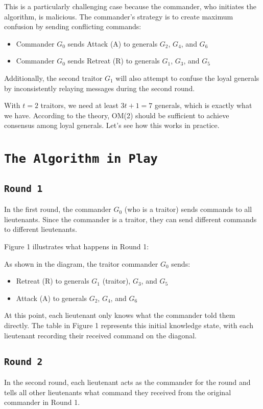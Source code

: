 \documentclass[11pt]{article}
\newcommand{\gen}[1]{\ensuremath{G_{#1}}}
\begin{document}
This is a particularly challenging case because the commander, who initiates the algorithm, is malicious. The commander's strategy is to create maximum confusion by sending conflicting commands:
\begin{itemize}
    \item Commander $G_0$ sends Attack (A) to generals $G_2$, $G_4$, and $G_6$
    \item Commander $G_0$ sends Retreat (R) to generals $G_1$, $G_3$, and $G_5$
\end{itemize}

Additionally, the second traitor $G_1$ will also attempt to confuse the loyal generals by inconsistently relaying messages during the second round.

With $t = 2$ traitors, we need at least $3t+1 = 7$ generals, which is exactly what we have. According to the theory, OM(2) should be sufficient to achieve consensus among loyal generals. Let's see how this works in practice.

\section*{\texttt{\Large The Algorithm in Play}}

\subsection*{\texttt{\large Round 1}}
In the first round, the commander $\gen{0}$ (who is a traitor) sends commands to all lieutenants. Since the commander is a traitor, they can send different commands to different lieutenants.

Figure 1 illustrates what happens in Round 1:



As shown in the diagram, the traitor commander $\gen{0}$ sends:
\begin{itemize}
    \item Retreat (R) to generals $\gen{1}$ (traitor), $\gen{3}$, and $\gen{5}$
    \item Attack (A) to generals $\gen{2}$, $\gen{4}$, and $\gen{6}$
\end{itemize}

At this point, each lieutenant only knows what the commander told them directly. The table in Figure 1 represents this initial knowledge state, with each lieutenant recording their received command on the diagonal.

\subsection*{\texttt{\large Round 2}}
In the second round, each lieutenant acts as the commander for the round and tells all other lieutenants what command they received from the original commander in Round 1.
\end{document}
